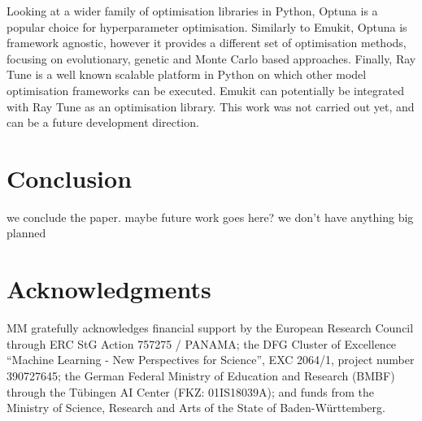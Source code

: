 Looking at a wider family of optimisation libraries in Python, Optuna \cite{optuna_2019} is a popular choice for hyperparameter optimisation. Similarly to Emukit, Optuna is framework agnostic, however it provides a different set of optimisation methods, focusing on evolutionary, genetic and Monte Carlo based approaches. Finally, Ray Tune \cite{liaw2018tune} is a well known scalable platform in Python on which other model optimisation frameworks can be executed. Emukit can potentially be integrated with Ray Tune as an optimisation library. This work was not carried out yet, and can be a future development direction.



\section{Conclusion}
we conclude the paper. maybe future work goes here? we don't have anything big planned

\section{Acknowledgments}
MM gratefully acknowledges financial support by the European Research Council through ERC StG Action 757275 / PANAMA; the DFG Cluster of Excellence “Machine Learning - New Perspectives for Science”, EXC 2064/1, project number 390727645; the German Federal Ministry of Education and Research (BMBF) through the T\"{u}bingen AI Center (FKZ: 01IS18039A); and funds from the Ministry of Science, Research and Arts of the State of Baden-W\"{u}rttemberg.
